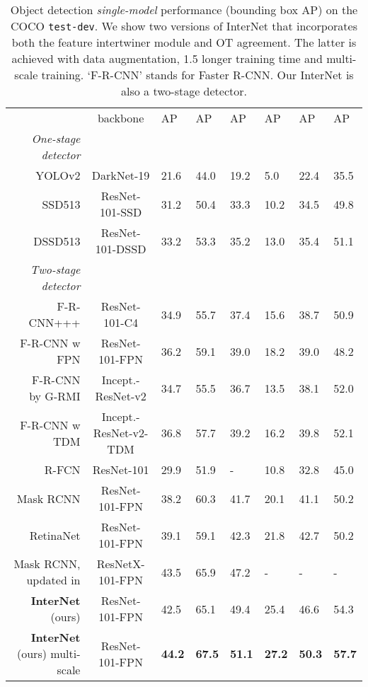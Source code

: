\documentclass{article} \usepackage{iclr2019_conference,times}
\newcommand{\tablestyle}[2]{\setlength{\tabcolsep}{#1}\renewcommand{\arraystretch}{#2}\centering\footnotesize}
\begin{document}
\begin{table*}[h]
	\tablestyle{0.5pt}{1.05}
	\centering
	\begin{tabular}{   r  |c|x{22}x{22}x{22}|x{22}x{22}x{22}}
		& backbone
		& AP & AP & AP
		& AP & AP &  AP\\ [.1em]
		\shline
		\emph{One-stage detector} & & & & & & & \\
		~YOLOv2 \citep{redmon2016_yolo_v2} & DarkNet-19 & 21.6 & 44.0 & 19.2 & 5.0 & 22.4 & 35.5 \\
		~SSD513 \citep{liu2015_ssd} & ResNet-101-SSD & 31.2 & 50.4 & 33.3 & 10.2 & 34.5 & 49.8 \\
		~DSSD513 \citep{fu2017_dssd} & ResNet-101-DSSD & 33.2 & 53.3 & 35.2 & 13.0 & 35.4 & 51.1 \\
		\hline
		\emph{Two-stage detector} & & & & & & & \\
		~F-R-CNN+++ \citep{he2016_resnet} & ResNet-101-C4 & 34.9 & 55.7 & 37.4 & 15.6 & 38.7 & 50.9\\
		~F-R-CNN w FPN \citep{lin2017_FPN} & ResNet-101-FPN
		& 36.2 & 59.1 & 39.0 & 18.2 & 39.0 & 48.2\\
		~F-R-CNN by G-RMI \citep{huang2017_speed_accuracy} & Incept.-ResNet-v2 
& 34.7 & 55.5 & 36.7 & 13.5 & 38.1 & 52.0\\
		~F-R-CNN w TDM \citep{shrivastava2016_top_down_modulation} & Incept.-ResNet-v2-TDM
		& 36.8 & 57.7 & 39.2 & 16.2 & 39.8 & {52.1}\\
		~R-FCN \citep{dai2016_rfcn} & ResNet-101 & 29.9 & 51.9  & - & 10.8 & 32.8 & 45.0 \\
		Mask RCNN \citep{he2017_mask_rcnn} & ResNet-101-FPN & 38.2 & 60.3 & 41.7 & 20.1 & 41.1 & 50.2 \\
		~{RetinaNet} \citep{lin2017_focal_loss} & ResNet-101-FPN & 39.1 & 59.1 & 42.3 & 21.8 & 42.7 & 50.2 \\
	Mask RCNN, updated in \citep{he2017_mask_rcnn}  & ResNetX-101-FPN & 43.5 &  65.9 &  47.2 & - & - & - \\
\hline 
~\textbf{InterNet} (ours) & ResNet-101-FPN & 42.5 & 65.1&  49.4& 25.4 & 46.6 & 54.3 \\
		~\textbf{InterNet} (ours) \scriptsize multi-scale & ResNet-101-FPN &  \textbf{44.2}& \textbf{67.5}&  \textbf{51.1}&  \textbf{27.2}&  \textbf{50.3}& \textbf{57.7} \\
	\end{tabular}
\caption{
		Object detection \textit{single-model} performance (bounding box AP) on the COCO \texttt{test-dev}. 
		We show two versions of InterNet that incorporates both the feature intertwiner module and OT agreement. The latter is achieved with data augmentation, 1.5 longer training time and multi-scale training.  `F-R-CNN' stands for Faster R-CNN.
Our InterNet is also a two-stage detector.
	}\label{tab:final_compare_complete}
\end{table*}
\end{document}
